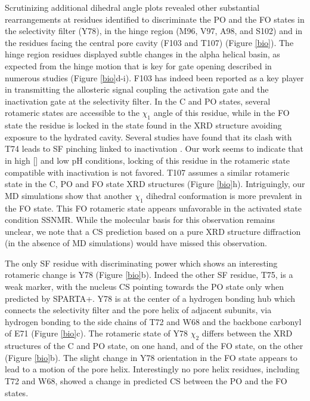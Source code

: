 \documentclass[%
 aip,
 amsmath,amssymb,
 preprint,%
]{revtex4-1}
\newcommand{\ca}{\ce{C_\alpha} }
\begin{document}
Scrutinizing additional dihedral angle plots revealed other substantial rearrangements at residues identified to discriminate the PO and the FO states in the selectivity filter (Y78), in the hinge region (M96, V97, A98, and S102) and in the residues facing the central pore cavity (F103 and T107) (Figure \ref{bio}). The hinge region residues displayed subtle changes in the alpha helical basin, as expected from the hinge motion that is key for gate opening described in numerous studies (Figure \ref{bio}d-i).\cite{Cuello2017,Li2018} F103 has indeed been reported as a key player in transmitting the allosteric signal coupling the activation gate and the inactivation gate at the selectivity filter.\cite{Li2018} In the C and PO states, several rotameric states are accessible to the $\chi_1$ angle of this residue, while in the FO state the residue is locked in the state found in the XRD structure avoiding exposure to the hydrated cavity. Several studies have found that its clash with T74 leads to SF pinching linked to inactivation \cite{Li2018,kopec2019molecular}. Our work seems to indicate that in high [] and low pH conditions, locking of this residue in the rotameric state compatible with inactivation is not favored. T107 assumes a similar rotameric state in the C, PO and FO state XRD structures (Figure \ref{bio}h). Intriguingly, our MD simulations show that another $\chi_1$ dihedral conformation is more prevalent in the FO state. This FO rotameric state appears unfavorable in the activated state condition SSNMR. While the molecular basis for this observation remains unclear, we note that a CS prediction based on a pure XRD structure diffraction (in the absence of MD simulations) would have missed this observation.

The only SF residue with discriminating power which shows an interesting rotameric change is Y78 (Figure \ref{bio}b). Indeed the other SF residue, T75, is a weak marker, with the \ca nucleus CS pointing towards the PO state only when predicted by SPARTA+. Y78 is at the center of a hydrogen bonding hub which connects the selectivity filter and the pore helix of adjacent subunits, via hydrogen bonding to the side chains of T72 and W68 and the backbone carbonyl of E71 (Figure \ref{bio}c). The rotameric state of Y78 $\chi_2$ differs between the XRD structures of the C and PO state, on one hand, and of the FO state, on the other (Figure \ref{bio}b). The slight change in Y78 orientation in the FO state appears to lead to a motion of the pore helix. Interestingly no pore helix residues, including T72 and W68, showed a change in predicted CS between the PO and the FO states.
\end{document}
